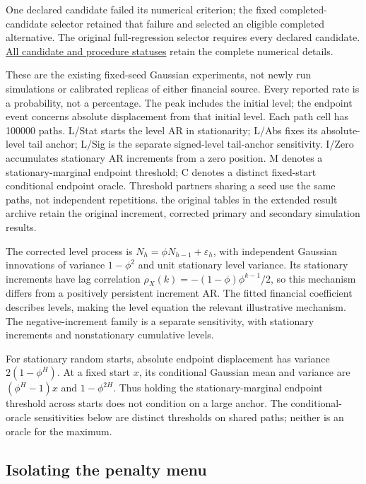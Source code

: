 \documentclass[10pt,a4paper]{article}
\begin{document}
One declared candidate failed its numerical criterion; the fixed completed-candidate selector retained that failure and selected an eligible completed alternative. The original full-regression selector requires every declared candidate. \href{https://github.com/ByronLi0207/financial-mathematics-paper-20261020/blob/submission-final/EXTENDED_RESULTS.md#asmbi-extended-s24}{All candidate and procedure statuses} retain the complete numerical details.

These are the existing fixed-seed Gaussian experiments, not newly run
simulations or calibrated replicas of either financial source. Every reported
rate is a probability, not a percentage. The peak includes the initial level;
the endpoint event concerns absolute displacement from that initial level.
Each path cell has 100000 paths.
L/Stat starts the level AR in stationarity; L/Abs fixes its absolute-level
tail anchor; L/Sig is the separate signed-level tail-anchor sensitivity.
I/Zero accumulates stationary AR increments from a zero position.
M denotes a stationary-marginal endpoint threshold; C denotes a distinct
fixed-start conditional endpoint oracle. Threshold partners sharing a seed use
the same paths, not independent repetitions.
the original tables in the extended result archive retain the original increment, corrected primary and secondary simulation results.

The corrected level process is
\(N_h=\phi N_{h-1}+\varepsilon_h\), with independent Gaussian innovations
of variance \(1-\phi^2\) and unit stationary level variance. Its stationary
increments have lag correlation
\(\rho_X(k)=-(1-\phi)\phi^{k-1}/2\), so this mechanism differs from a
positively persistent increment AR. The fitted financial coefficient describes
levels, making the level equation the relevant illustrative mechanism.
The negative-increment family is a separate sensitivity, with stationary
increments and nonstationary cumulative levels.

For stationary random starts, absolute endpoint displacement has
variance \(2(1-\phi^H)\). At a fixed start \(x\), its conditional Gaussian
mean and variance are \((\phi^H-1)x\) and \(1-\phi^{2H}\). Thus holding the
stationary-marginal endpoint threshold across starts does not condition on a
large anchor. The conditional-oracle sensitivities below are distinct thresholds
on shared paths; neither is an oracle for the maximum.

\subsection{Isolating the penalty menu}\label{sec:extensions}
\end{document}

